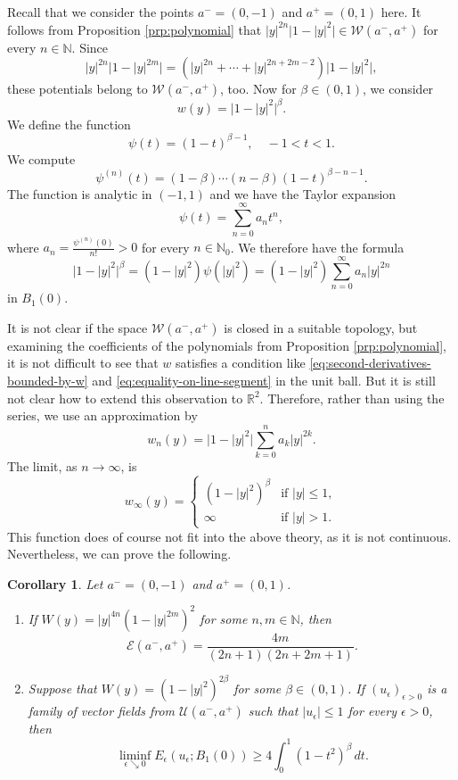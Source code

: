 \documentclass[a4paper]{article}
\newcommand{\R}{\mathbb{R}}
\newcommand{\N}{\mathbb{N}}
\newtheorem{corollary}[theorem]{Corollary}
\theoremstyle{definition}
\theoremstyle{remark}
\begin{document}
Recall that we consider the points $a^- = (0, -1)$ and $a^+ = (0, 1)$ here.
It follows from Proposition \ref{prp:polynomial} that $|y|^{2n}\bigl|1 - |y|^2\bigr| \in \mathcal{W}(a^-, a^+)$
for every $n \in \N$. Since
\[
|y|^{2n} \bigl|1 - |y|^{2m}\bigr| = (|y|^{2n} + \dotsb + |y|^{2n + 2m - 2}) \bigl|1 - |y|^2\bigr|,
\]
these potentials belong to $\mathcal{W}(a^-, a^+)$, too. Now for
$\beta \in (0, 1)$, we consider
\[
w(y) = \bigl|1 - |y|^2\bigr|^\beta.
\]
We define the function
\[
\psi(t) = (1 - t)^{\beta - 1}, \quad -1 < t < 1.
\]
We compute
\[
\psi^{(n)}(t) = (1 - \beta) \dotsb (n - \beta) (1 - t)^{\beta - n - 1}.
\]
The function is analytic in $(-1, 1)$ and we have the Taylor expansion
\[
\psi(t) = \sum_{n = 0}^\infty a_n t^n,
\]
where $a_n = \frac{\psi^{(n)}(0)}{n!} > 0$ for every $n \in \N_0$. We
therefore have the formula
\[
\bigl|1 - |y|^2\bigr|^\beta = (1 - |y|^2) \psi(|y|^2) = (1 - |y|^2) \sum_{n = 0}^\infty a_n |y|^{2n}
\]
in $B_1(0)$.

It is not clear if the space $\mathcal{W}(a^-, a^+)$ is closed in a suitable
topology, but examining the coefficients of the polynomials from
Proposition \ref{prp:polynomial}, it is not difficult to see that $w$
satisfies a condition like \eqref{eq:second-derivatives-bounded-by-w} and
\eqref{eq:equality-on-line-segment} in the unit ball. But it is still not clear
how to extend this observation to $\R^2$. Therefore, rather than using
the series, we use an approximation by
\[
w_n(y) = \bigl|1 - |y|^2\bigr| \sum_{k = 0}^n a_k |y|^{2k}.
\]
The limit, as $n \to \infty$, is
\[
w_\infty(y) = \begin{cases}
(1 - |y|^2)^\beta & \text{if $|y| \le 1$}, \\
\infty & \text{if $|y| > 1$}.
\end{cases}
\]
This function does of course not fit into the above theory, as it is not continuous.
Nevertheless, we can prove the following.

\begin{corollary} \label{cor:examples}
Let $a^- = (0, -1)$ and $a^+ = (0, 1)$.
\begin{enumerate}
\item If $W(y) = |y|^{4n}(1 - |y|^{2m})^2$ for some $n, m \in \N$, then
\[
\mathcal{E}(a^-, a^+) = \frac{4m}{(2n + 1)(2n + 2m + 1)}.
\]
\item Suppose that $W(y) = (1 - |y|^2)^{2\beta}$ for some $\beta \in (0, 1)$. If $(u_\epsilon)_{\epsilon > 0}$
is a family of vector fields from $\mathcal{U}(a^-, a^+)$ such that $|u_\epsilon| \le 1$ for every $\epsilon > 0$, then
\[
\liminf_{\epsilon \searrow 0} E_\epsilon(u_\epsilon; B_1(0)) \ge 4\int_0^1 (1 - t^2)^\beta \, dt.
\]
\end{enumerate}
\end{corollary}
\end{document}
